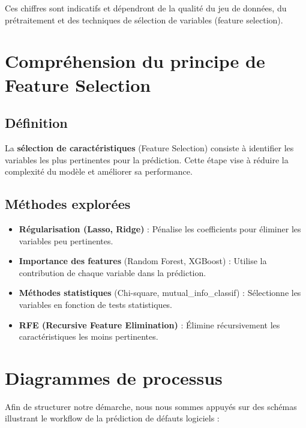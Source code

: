 \documentclass[12pt,a4paper]{report}
\begin{document}
Ces chiffres sont indicatifs et dépendront de la qualité du jeu de données, 
du prétraitement et des techniques de sélection de variables (feature selection).

\chapter{Compréhension du principe de Feature Selection}
\section{Définition}
La \textbf{sélection de caractéristiques} (Feature Selection) consiste à identifier 
les variables les plus pertinentes pour la prédiction. Cette étape vise à réduire 
la complexité du modèle et améliorer sa performance.

\section{Méthodes explorées}
\begin{itemize}
    \item \textbf{Régularisation (Lasso, Ridge)} : Pénalise les coefficients pour 
    éliminer les variables peu pertinentes.
    \item \textbf{Importance des features} (Random Forest, XGBoost) : Utilise la 
    contribution de chaque variable dans la prédiction.
    \item \textbf{Méthodes statistiques} (Chi-square, mutual\_info\_classif) : 
    Sélectionne les variables en fonction de tests statistiques.
    \item \textbf{RFE (Recursive Feature Elimination)} : Élimine récursivement 
    les caractéristiques les moins pertinentes.
\end{itemize}

\chapter{Diagrammes de processus}
Afin de structurer notre démarche, nous nous sommes appuyés sur des schémas illustrant 
le workflow de la prédiction de défauts logiciels :
\end{document}
